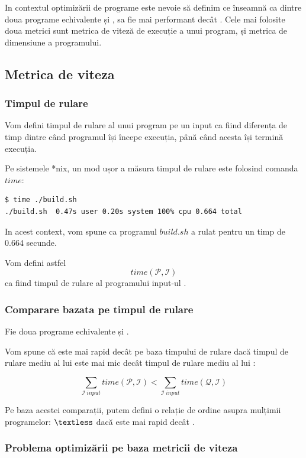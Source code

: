 In contextul optimizării de programe este nevoie să definim ce
înseamnă ca dintre doua programe echivalente  și , 
sa fie mai performant decât .
Cele mai folosite doua metrici sunt metrica de viteză de
execuție a unui program, și metrica de dimensiune a programului.

\subsection{Metrica de viteza}

\subsubsection{Timpul de rulare}

Vom defini timpul de rulare al unui program  pe un input
 ca fiind diferența de timp dintre când programul își începe
execuția, până când acesta își termină execuția.

Pe sistemele *nix, un mod ușor a măsura timpul de rulare este
folosind comanda $time$:

\begin{lstlisting}[language=Bash]
$ time ./build.sh
./build.sh  0.47s user 0.20s system 100% cpu 0.664 total
\end{lstlisting}

In acest context, vom spune ca programul $build.sh$ a rulat
pentru un timp de 0.664 secunde.

Vom defini astfel \[time(\mathcal{P}, \mathcal{I})\] ca fiind
timpul de rulare al programului  input-ul .

\subsubsection{Comparare bazata pe timpul de rulare}

Fie doua programe echivalente  și .

Vom spune că  este mai rapid decât  pe baza timpului de
rulare dacă timpul de rulare mediu al lui  este mai mic
decât timpul de rulare mediu al lui :

\[
	\sum_{\mathcal{I} \ input} time(\mathcal{P}, \mathcal{I}) <
	\sum_{\mathcal{I} \ input} time(\mathcal{Q}, \mathcal{I})
\]

Pe baza acestei comparații, putem defini o relație de ordine
asupra mulțimii programelor:  $\textless$  dacă 
este mai rapid decât .

\subsubsection{Problema optimizării pe baza metricii de viteza}

